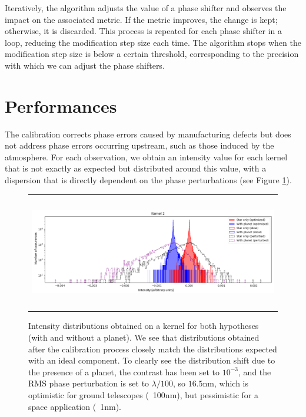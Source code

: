 \documentclass[]{spie}  %
\begin{document}
Iteratively, the algorithm adjusts the value of a phase shifter and observes the impact on the associated metric. If the metric improves, the change is kept; otherwise, it is discarded. This process is repeated for each phase shifter in a loop, reducing the modification step size each time. The algorithm stops when the modification step size is below a certain threshold, corresponding to the precision with which we can adjust the phase shifters.

\section{Performances}

The calibration corrects phase errors caused by manufacturing defects but does not address phase errors occurring upstream, such as those induced by the atmosphere. For each observation, we obtain an intensity value for each kernel that is not exactly as expected but distributed around this value, with a dispersion that is directly dependent on the phase perturbations (see Figure \ref{fig:distrib}).

\begin{figure} [H]
    \begin{center}
    \begin{tabular}{c}
    \includegraphics[height=5cm]{img/distrib.png}
    \end{tabular}
    \end{center}
    \caption[distrib] 
    { \label{fig:distrib} 
    Intensity distributions obtained on a kernel for both hypotheses (with and without a planet). We see that distributions obtained after the calibration process closely match the distributions expected with an ideal component. To clearly see the distribution shift due to the presence of a planet, the contrast has been set to $10^{-3}$, and the RMS phase perturbation is set to $\lambda / 100$, so $16.5$nm, which is optimistic for ground telescopes (~100nm), but pessimistic for a space application (~1nm).}
\end{figure}
\end{document}

